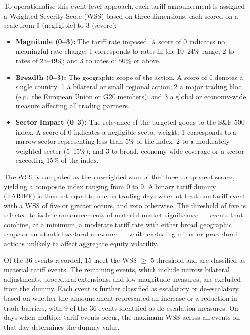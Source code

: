To operationalise this event-level approach, each tariff announcement is assigned a Weighted Severity Score (WSS) based on three dimensions, each scored on a scale from 0 (negligible) to 3 (severe):

\begin{itemize}
    \item \textbf{Magnitude (0--3):} The tariff rate imposed. A score of 0 indicates no meaningful rate change; 1 corresponds to rates in the 10--24\% range; 2 to rates of 25--49\%; and 3 to rates of 50\% or above.
    \item \textbf{Breadth (0--3):} The geographic scope of the action. A score of 0 denotes a single country; 1 a bilateral or small regional action; 2 a major trading bloc (e.g.\ the European Union or G20 members); and 3 a global or economy-wide measure affecting all trading partners.
    \item \textbf{Sector Impact (0--3):} The relevance of the targeted goods to the S\&P 500 index. A score of 0 indicates a negligible sector weight; 1 corresponds to a narrow sector representing less than 5\% of the index; 2 to a moderately weighted sector (5--15\%); and 3 to broad, economy-wide coverage or a sector exceeding 15\% of the index.
\end{itemize}

The WSS is computed as the unweighted sum of the three component scores, yielding a composite index ranging from 0 to 9. A binary tariff dummy (TARIFF) is then set equal to one on trading days when at least one tariff event with a WSS of five or greater occurs, and zero otherwise. The threshold of five is selected to isolate announcements of material market significance --- events that combine, at a minimum, a moderate tariff rate with either broad geographic scope or substantial sectoral relevance --- while excluding minor or procedural actions unlikely to affect aggregate equity volatility.

Of the 36 events recorded, 15 meet the WSS $\geq$ 5 threshold and are classified as material tariff events. The remaining events, which include narrow bilateral adjustments, procedural extensions, and low-magnitude measures, are excluded from the dummy. Each event is further classified as escalatory or de-escalatory based on whether the announcement represented an increase or a reduction in trade barriers, with 9 of the 36 events identified as de-escalation measures. On days when multiple tariff events occur, the maximum WSS across all events on that day determines the dummy value.

